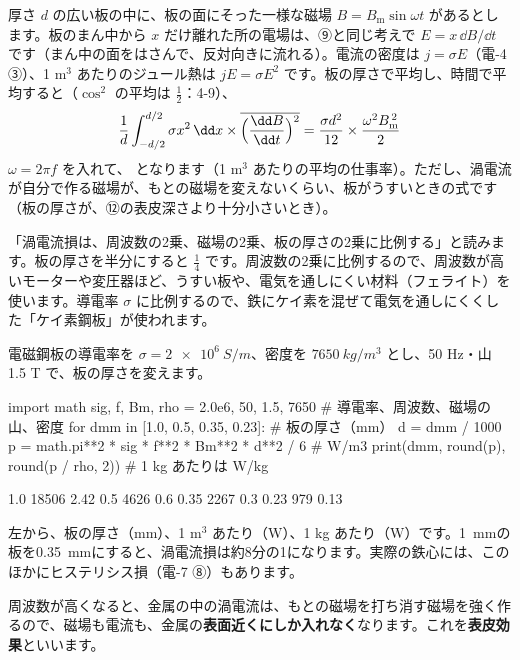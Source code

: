 厚さ $d$ の広い板の中に、板の面にそった一様な磁場 $B=B_{\mathrm m}\sin\omega t$ があるとします。板のまん中から $x$ だけ離れた所の電場は、⑨と同じ考えで $E=x\,\dd B/\dd t$ です（まん中の面をはさんで、反対向きに流れる）。電流の密度は $j=\sigma E$（電-4 ③）、1 m$^3$ あたりのジュール熱は $jE=\sigma E^2$ です。板の厚さで平均し、時間で平均すると（$\cos^2$ の平均は $\tfrac12$：4-9）、
\[ \frac1d\int_{-d/2}^{d/2}\sigma x^2\,\dd x\times\overline{\Bigl(\frac{\dd B}{\dd t}\Bigr)^2}=\frac{\sigma d^2}{12}\times\frac{\omega^2B_{\mathrm m}^{\,2}}{2} \]
$\omega=2\pi f$ を入れて、
\label{ph:電-8:uzuson}となります（1 m$^3$ あたりの平均の仕事率）。ただし、渦電流が自分で作る磁場が、もとの磁場を変えないくらい、板がうすいときの式です（板の厚さが、⑫の表皮深さより十分小さいとき）。

\begin{phyomi}
「渦電流損は、周波数の2乗、磁場の2乗、板の厚さの2乗に比例する」と読みます。板の厚さを半分にすると $\tfrac14$ です。周波数の2乗に比例するので、周波数が高いモーターや変圧器ほど、うすい板や、電気を通しにくい材料（フェライト）を使います。導電率 $\sigma$ に比例するので、鉄にケイ素を混ぜて電気を通しにくくした「ケイ素鋼板」が使われます。
\end{phyomi}

電磁鋼板の導電率を $\sigma=\qty{2e6}{S/m}$、密度を $\qty{7650}{kg/m^3}$ とし、50 Hz・山 1.5 T で、板の厚さを変えます。
\begin{phcode}[Python]
import math
sig, f, Bm, rho = 2.0e6, 50, 1.5, 7650   \# 導電率、周波数、磁場の山、密度
for dmm in [1.0, 0.5, 0.35, 0.23]:      \# 板の厚さ（mm）
    d = dmm / 1000
    p = math.pi**2 * sig * f**2 * Bm**2 * d**2 / 6   \# W/m3
    print(dmm, round(p), round(p / rho, 2))       \# 1 kg あたりは W/kg
\end{phcode}
\begin{phcodeout}
1.0 18506 2.42
0.5 4626 0.6
0.35 2267 0.3
0.23 979 0.13
\end{phcodeout}
左から、板の厚さ（mm）、1 m$^3$ あたり（W）、1 kg あたり（W）です。\qty{1}{mm}の板を\qty{0.35}{mm}にすると、渦電流損は約8分の1になります。実際の鉄心には、このほかにヒステリシス損（電-7 ⑧）もあります。

\label{ph:電-8:sec12}
周波数が高くなると、金属の中の渦電流は、もとの磁場を打ち消す磁場を強く作るので、磁場も電流も、金属の\textbf{表面近くにしか入れなく}なります。これを\textbf{表皮効果}といいます。

